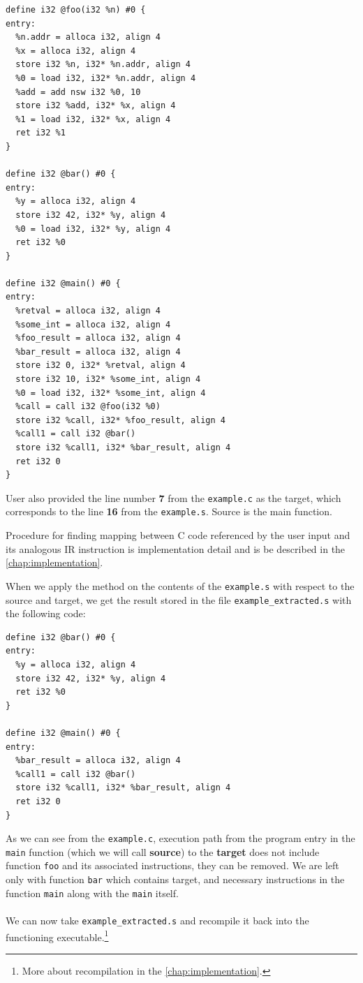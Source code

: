 \documentclass[12pt, twoside]{fithesis2}
\renewcommand{\_}{\leavevmode \kern0.07em\vbox{\hrule width0.4em}}
\begin{document}
\begin{verbatim}
define i32 @foo(i32 %n) #0 {
entry:
  %n.addr = alloca i32, align 4
  %x = alloca i32, align 4
  store i32 %n, i32* %n.addr, align 4
  %0 = load i32, i32* %n.addr, align 4
  %add = add nsw i32 %0, 10
  store i32 %add, i32* %x, align 4
  %1 = load i32, i32* %x, align 4
  ret i32 %1
}

define i32 @bar() #0 {
entry:
  %y = alloca i32, align 4
  store i32 42, i32* %y, align 4
  %0 = load i32, i32* %y, align 4
  ret i32 %0
}

define i32 @main() #0 {
entry:
  %retval = alloca i32, align 4
  %some_int = alloca i32, align 4
  %foo_result = alloca i32, align 4
  %bar_result = alloca i32, align 4
  store i32 0, i32* %retval, align 4
  store i32 10, i32* %some_int, align 4
  %0 = load i32, i32* %some_int, align 4
  %call = call i32 @foo(i32 %0)
  store i32 %call, i32* %foo_result, align 4
  %call1 = call i32 @bar()
  store i32 %call1, i32* %bar_result, align 4
  ret i32 0
}
\end{verbatim}

User also provided the line number \textbf{7} from the
\texttt{example.c} as the target, which corresponds to the line
\textbf{16} from the \texttt{example.s}. Source is the main function.

Procedure for finding mapping between C code referenced by the user input and
its analogous IR instruction is implementation detail and is be described
in the \autoref{chap:implementation}.

When we apply the method on the contents of the
\texttt{example.s} with respect to the source and target,
we get the result stored in the file
\texttt{example_extracted.s} with the following code:

\begin{verbatim}
define i32 @bar() #0 {
entry:
  %y = alloca i32, align 4
  store i32 42, i32* %y, align 4
  ret i32 %0
}

define i32 @main() #0 {
entry:
  %bar_result = alloca i32, align 4
  %call1 = call i32 @bar()
  store i32 %call1, i32* %bar_result, align 4
  ret i32 0
}
\end{verbatim}

As we can see from the \texttt{example.c}, execution path from
the program entry in the \texttt{main} function (which we will
call \textbf{source}) to the \textbf{target} does not include function
\texttt{foo} and its associated instructions, they can be removed.
We are left only with function \texttt{bar} which contains target,
and necessary instructions in the function \texttt{main} along with
the \texttt{main} itself.
\\
\\
We can now take \texttt{example_extracted.s} and recompile it back
into the functioning executable.\footnote{
More about recompilation in the \autoref{chap:implementation}.
}
\end{document}
